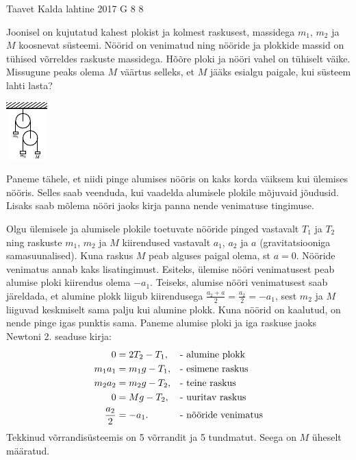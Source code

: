 {Taavet Kalda} %
{lahtine} %
{2017} %
{G 8} %
{8} %
{
\ifStatement
Joonisel on kujutatud kahest plokist ja kolmest raskusest, massidega $m_1$, $m_2$ ja $M$ koosnevat süsteemi. Nöörid on venimatud ning nööride ja plokkide massid on tühised võrreldes raskuste massidega. Hõõre ploki ja nööri vahel on tühiselt väike. Missugune peaks olema $M$ väärtus selleks, et $M$ jääks esialgu paigale, kui süsteem lahti lasta?

\begin{center}
	\vspace{-10pt}
	\includegraphics[width = 0.3\linewidth] {2017-lahg-08-double_pulleys_img.pdf}
\end{center}
\fi


\ifHint
Paneme tähele, et niidi pinge alumises nööris on kaks korda väiksem kui ülemises nööris. Selles saab veenduda, kui vaadelda alumisele plokile mõjuvaid jõudusid. Lisaks saab mõlema nööri jaoks kirja panna nende venimatuse tingimuse.
\fi


\ifSolution
Olgu ülemisele ja alumisele plokile toetuvate nööride pinged vastavalt $T_1$ ja $T_2$ ning raskuste $m_1$, $m_2$ ja $M$ kiirendused vastavalt $a_1$, $a_2$ ja $a$ (gravitatsiooniga samasuunalised). Kuna raskus $M$ peab alguses paigal olema, st $a = 0$. Nööride venimatus annab kaks lisatingimust. Esiteks, ülemise nööri venimatusest peab alumise ploki kiirendus olema $-a_1$. Teiseks, alumise nööri venimatusest saab järeldada, et alumine plokk liigub kiirendusega $\frac{a_2 + a}{2} = \frac{a_2}{2} = -a_1$, sest $m_2$ ja $M$ liiguvad keskmiselt sama palju kui alumine plokk. Kuna nöörid on kaalutud, on nende pinge igas punktis sama. Paneme alumise ploki ja iga raskuse jaoks Newtoni 2. seaduse kirja:
\begin{align}
0 &= 2T_2 - T_1,				& &\text{- alumine plokk}\label{Plokid:eq-1}\\
m_1a_1 &= m_1g - T_1,			& &\text{- esimene raskus}\label{Plokid:eq-2}\\
m_2a_2 &= m_2g - T_2,			& &\text{- teine raskus}\label{Plokid:eq-3}\\
0 &= Mg - T_2,					& &\text{- uuritav raskus}\label{Plokid:eq-4}\\
\frac{a_2}{2} &= -a_1.			& &\text{- nööride venimatus\label{Plokid:eq-5}}
\end{align}
Tekkinud võrrandisüsteemis on 5 võrrandit ja 5 tundmatut. Seega on $M$ üheselt määratud.

}
